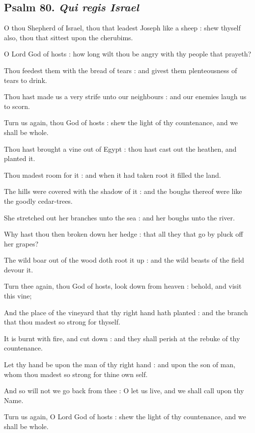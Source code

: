 \subsection{Psalm 80. \textit{Qui regis Israel}}

 O thou Shepherd of Israel, thou that leadest Joseph like a sheep : shew thyself also, thou that sittest upon the cherubims.\par
{}
O Lord God of hosts : how long wilt thou be angry with thy people that prayeth?\par
{}Thou feedest them with the bread of tears : and givest them plenteousness of tears to drink.\par
{}Thou hast made us a very strife unto our neighbours : and our enemies laugh us to scorn.\par
{}Turn us again, thou God of hosts : shew the light of thy countenance, and we shall be whole.\par
{}Thou hast brought a vine out of Egypt : thou hast cast out the heathen, and planted it.\par
{}Thou madest room for it : and when it had taken root it filled the land.\par
{}The hills were covered with the shadow of it : and the boughs thereof were like the goodly cedar-trees.\par
{}She stretched out her branches unto the sea : and her boughs unto the river.\par
{}Why hast thou then broken down her hedge : that all they that go by pluck off her grapes?\par
{}The wild boar out of the wood doth root it up : and the wild beasts of the field devour it.\par
{}Turn thee again, thou God of hosts, look down from heaven : behold, and visit this vine;\par
{}And the place of the vineyard that thy right hand hath planted : and the branch that thou madest so strong for thyself.\par
{}It is burnt with fire, and cut down : and they shall perish at the rebuke of thy countenance.\par
{}Let thy hand be upon the man of thy right hand : and upon the son of man, whom thou madest so strong for thine own self.\par
{}And so will not we go back from thee : O let us live, and we shall call upon thy Name.\par
{}Turn us again, O Lord God of hosts : shew the light of thy countenance, and we shall be whole.\par

